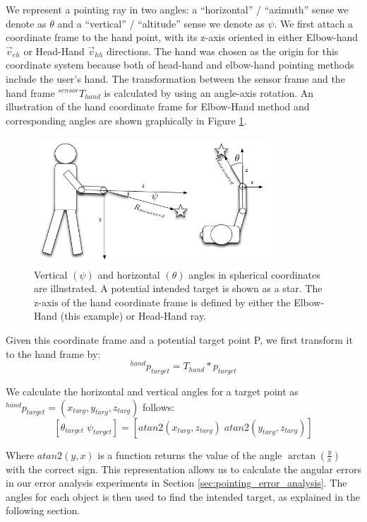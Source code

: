 We represent a pointing ray in two angles: a ``horizontal'' / ``azimuth'' sense we denote as $\theta$ and a ``vertical'' / ``altitude'' sense we denote as $\psi$. We first attach a coordinate frame to the hand point, with its z-axis oriented in either Elbow-hand $\vec{v}_{eh}$ or Head-Hand $\vec{v}_{hh}$ directions. The hand was chosen as the origin for this coordinate system because both of head-hand and elbow-hand pointing methods include the user's hand. The transformation between the sensor frame and the hand frame $^{sensor}T_{hand}$ is calculated by using an angle-axis rotation. An illustration of the hand coordinate frame for Elbow-Hand method and corresponding angles are shown graphically in Figure \ref{fig:pointing_angle_errors}.

\begin{figure}[ht!]
\centering
\includegraphics[width=0.8\textwidth]{pics/person_angles_combined_2.png}
\caption{Vertical $(\psi)$ and horizontal $(\theta)$ angles in spherical coordinates are illustrated. A potential intended target is shown as a star. The z-axis of the hand coordinate frame is defined by either the Elbow-Hand (this example) or Head-Hand ray.}
\label{fig:pointing_angle_errors}
\end{figure}

Given this coordinate frame and a potential target point P, we first transform it to the hand frame by:
$$^{hand}p_{target} = T_{hand} * p_{target}$$

We calculate the horizontal and vertical angles for a target point as $^{hand}p_{target} = (x_{targ}, y_{targ}, z_{targ})$ follows:
$$[\theta_{target}\;\psi_{target}]=[atan2(x_{targ}, z_{targ})\;atan2(y_{targ}, z_{targ})]$$

Where $atan2(y,x)$ is a function returns the value of the angle $\arctan(\frac{y}{x})$ with the correct sign. This representation allows us to calculate the angular errors in our error analysis experiments in Section \ref{sec:pointing_error_analysis}. The angles for each object is then used to find the intended target, as explained in the following section.


